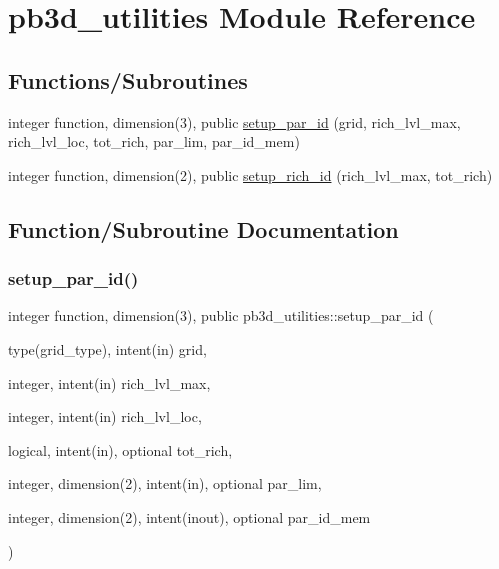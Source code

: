 \hypertarget{namespacepb3d__utilities}{}\section{pb3d\+\_\+utilities Module Reference}
\label{namespacepb3d__utilities}
\subsection*{Functions/\+Subroutines}
\begin{DoxyCompactItemize}
\item 
integer function, dimension(3), public \hyperlink{namespacepb3d__utilities_ad047cd7b197aae821e2565933faccfa3}{setup\+\_\+par\+\_\+id} (grid, rich\+\_\+lvl\+\_\+max, rich\+\_\+lvl\+\_\+loc, tot\+\_\+rich, par\+\_\+lim, par\+\_\+id\+\_\+mem)
\item 
integer function, dimension(2), public \hyperlink{namespacepb3d__utilities_ab461e756a85b3c6e8fa1ccaa6556c5b0}{setup\+\_\+rich\+\_\+id} (rich\+\_\+lvl\+\_\+max, tot\+\_\+rich)
\end{DoxyCompactItemize}


\subsection{Function/\+Subroutine Documentation}
\mbox{\label{namespacepb3d__utilities_ad047cd7b197aae821e2565933faccfa3}} 
\subsubsection{\texorpdfstring{setup\+\_\+par\+\_\+id()}{setup\_par\_id()}}
{\footnotesize\ttfamily integer function, dimension(3), public pb3d\+\_\+utilities\+::setup\+\_\+par\+\_\+id (\begin{DoxyParamCaption}\item[{type(grid\+\_\+type), intent(in)}]{grid,  }\item[{integer, intent(in)}]{rich\+\_\+lvl\+\_\+max,  }\item[{integer, intent(in)}]{rich\+\_\+lvl\+\_\+loc,  }\item[{logical, intent(in), optional}]{tot\+\_\+rich,  }\item[{integer, dimension(2), intent(in), optional}]{par\+\_\+lim,  }\item[{integer, dimension(2), intent(inout), optional}]{par\+\_\+id\+\_\+mem }\end{DoxyParamCaption})}



